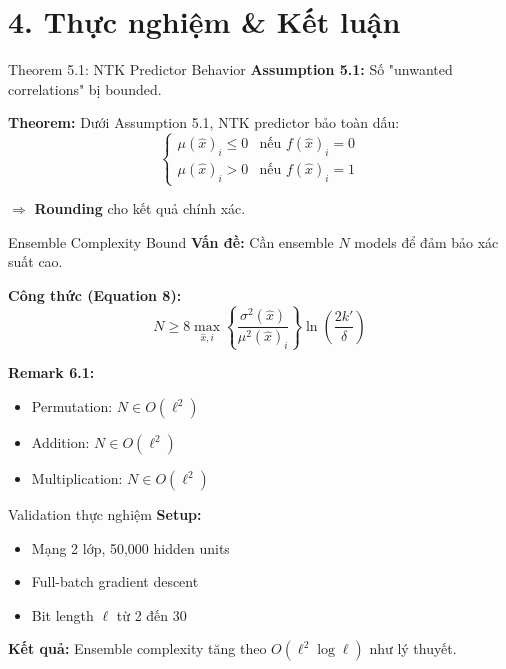 \section{4. Thực nghiệm \& Kết luận}

\begin{frame}{Theorem 5.1: NTK Predictor Behavior}
  \textbf{Assumption 5.1:} Số "unwanted correlations" bị bounded.

  \vspace{0.3cm}
  \textbf{Theorem:} Dưới Assumption 5.1, NTK predictor bảo toàn dấu:
  \[
    \begin{cases}
      \mu(\hat{x})_i \le 0 & \text{nếu } f(\hat{x})_i = 0 \\
      \mu(\hat{x})_i > 0 & \text{nếu } f(\hat{x})_i = 1
    \end{cases}
  \]

  $\Rightarrow$ \textbf{Rounding} cho kết quả chính xác.
\end{frame}

\begin{frame}{Ensemble Complexity Bound}
  \textbf{Vấn đề:} Cần ensemble $N$ models để đảm bảo xác suất cao.

  \vspace{0.3cm}
  \textbf{Công thức (Equation 8):}
  \[
    N \ge 8 \max_{\hat{x}, i} \left\{ \frac{\sigma^2(\hat{x})}{\mu^2(\hat{x})_i} \right\} \ln\left(\frac{2k'}{\delta}\right)
  \]

  \textbf{Remark 6.1:}
  \begin{itemize}
    \item Permutation: $N \in O(\ell^2)$
    \item Addition: $N \in O(\ell^2)$
    \item Multiplication: $N \in O(\ell^2)$
  \end{itemize}
\end{frame}

\begin{frame}{Validation thực nghiệm}
  \textbf{Setup:}
  \begin{itemize}
    \item Mạng 2 lớp, 50,000 hidden units
    \item Full-batch gradient descent
    \item Bit length $\ell$ từ 2 đến 30
  \end{itemize}

  \vspace{0.3cm}
  \textbf{Kết quả:} Ensemble complexity tăng theo $O(\ell^2 \log \ell)$ như lý thuyết.
\end{frame}

